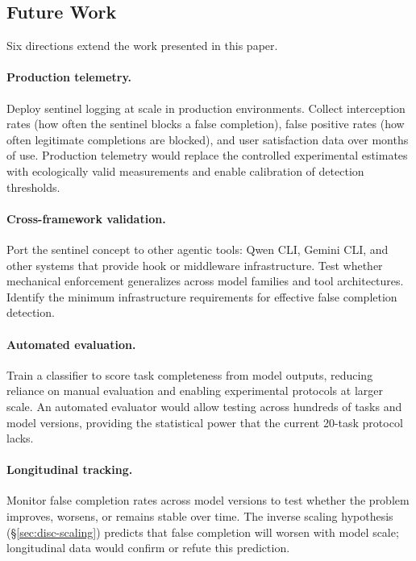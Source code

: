 \subsection{Future Work}
\label{sec:future-work}

Six directions extend the work presented in this paper.

\paragraph{Production telemetry.}
Deploy sentinel logging at scale in production environments.
Collect interception rates (how often the sentinel blocks a false completion), false positive rates (how often legitimate completions are blocked), and user satisfaction data over months of use.
Production telemetry would replace the controlled experimental estimates with ecologically valid measurements and enable calibration of detection thresholds.

\paragraph{Cross-framework validation.}
Port the sentinel concept to other agentic tools: Qwen CLI, Gemini CLI, and other systems that provide hook or middleware infrastructure.
Test whether mechanical enforcement generalizes across model families and tool architectures.
Identify the minimum infrastructure requirements for effective false completion detection.

\paragraph{Automated evaluation.}
Train a classifier to score task completeness from model outputs, reducing reliance on manual evaluation and enabling experimental protocols at larger scale.
An automated evaluator would allow testing across hundreds of tasks and model versions, providing the statistical power that the current 20-task protocol lacks.

\paragraph{Longitudinal tracking.}
Monitor false completion rates across model versions to test whether the problem improves, worsens, or remains stable over time.
The inverse scaling hypothesis (\S\ref{sec:disc-scaling}) predicts that false completion will worsen with model scale; longitudinal data would confirm or refute this prediction.

